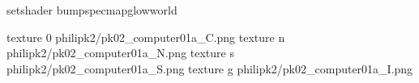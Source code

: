 setshader bumpspecmapglowworld


texture 0 philipk2/pk02_computer01a_C.png
texture n philipk2/pk02_computer01a_N.png
texture s philipk2/pk02_computer01a_S.png
texture g philipk2/pk02_computer01a_I.png


